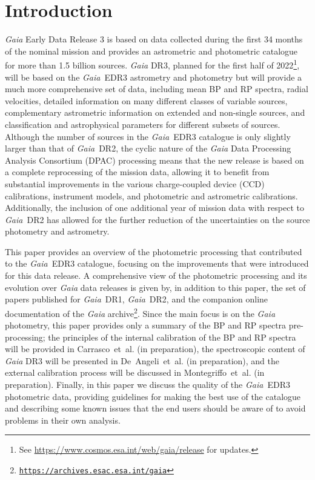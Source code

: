 \documentclass{aa}
\newcommand{\gaia}{\textit{Gaia}\xspace}
\newcommand{\dro}{\gaia~DR1\xspace}
\newcommand{\drt}{\gaia~DR2\xspace}
\newcommand{\edr}{\gaia~EDR3\xspace}
\newcommand{\xp}{BP and RP\xspace}
\newcommand{\webref}[1]{\href{#1}{#1}}
\newcommand{\citeip}[1]{#1~et~al. (in preparation)\xspace}
\begin{document}

\maketitle
%

\section{Introduction}\label{sec:intro}

\gaia Early Data Release 3 \citep[EDR3,][]{DPACP-130} is based on data collected during the first 34 months of the nominal mission \citep{GaiaRef} and provides an astrometric and photometric catalogue for more than 1.5 billion sources. \gaia DR3, planned for the first half of 2022\footnote{See \webref{https://www.cosmos.esa.int/web/gaia/release} for updates.}, will be based on the \edr astrometry and photometry but will provide a much more comprehensive set of data, including mean \xp spectra, radial velocities, detailed information on many different classes of variable sources, complementary astrometric information on extended and non-single sources, and classification and astrophysical parameters for different subsets of sources.
Although the number of sources in the \edr catalogue is only slightly larger than that of \drt, the cyclic nature of the \gaia Data Processing Analysis Consortium (DPAC) processing means that the new release is based on a complete reprocessing of the mission data, allowing it to benefit from substantial improvements in the various charge-coupled device (CCD) calibrations, instrument models, and photometric and astrometric calibrations. Additionally, the inclusion of one additional year of mission data with respect to \drt has allowed for the further reduction of the uncertainties on the source photometry and astrometry.

This paper provides an overview of the photometric processing that contributed to the \edr catalogue, focusing on the improvements that were introduced for this data release. A comprehensive view of the photometric processing and its evolution over \gaia data releases is given by, in addition to this paper, the set of papers published for \dro \citep{PhotCore, PhotValDR1, DR1_PhotTop}, \drt \citep{Proc_DR2, Phot_DR2}, and the companion online documentation of the \gaia archive\footnote{
\href{https://archives.esac.esa.int/gaia}{\tt https://archives.esac.esa.int/gaia}}. Since the main focus is on the \gaia photometry, this paper provides only a summary of the \xp spectra pre-processing; the principles of the internal calibration of the \xp spectra will be provided in \citeip{Carrasco}, the spectroscopic content of \gaia DR3 will be presented in \citeip{De~Angeli}, and the external calibration process will be discussed in \citeip{Montegriffo}.
Finally, in this paper we discuss the quality of the \edr photometric data, providing guidelines for making the best use of the catalogue and describing some known issues that the end users should be aware of to avoid problems in their own analysis.
\end{document}
